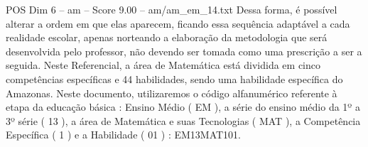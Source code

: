 \begin{textsample}{POS Dim 6 – am – Score 9.00 – am/am\_em\_14.txt}
Dessa forma, é possível alterar a ordem em que elas aparecem, ficando essa sequência adaptável a cada realidade escolar, apenas norteando a elaboração da metodologia que será desenvolvida pelo professor, não devendo ser tomada como uma prescrição a ser a seguida.
Neste Referencial, a área de Matemática está dividida em cinco competências específicas e 44 habilidades, sendo uma habilidade específica do Amazonas.
Neste documento, utilizaremos o código alfanumérico referente à etapa da educação básica : Ensino Médio ( EM ), a série do ensino médio da 1º a 3º série ( 13 ), a área de Matemática e suas Tecnologias ( MAT ), a Competência Específica ( 1 ) e a Habilidade ( 01 ) : EM13MAT101.

\end{textsample}
